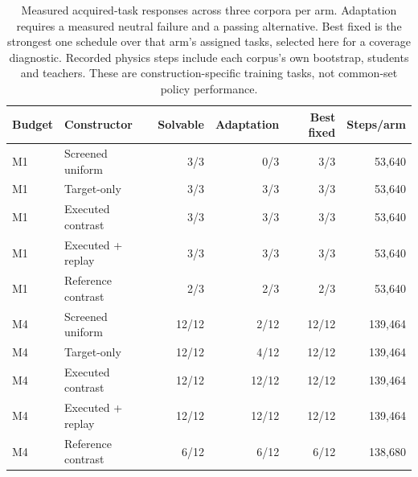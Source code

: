\begin{table}[t]
\centering\small
\begin{tabular}{llrrrr}
\toprule
Budget & Constructor & Solvable & Adaptation & Best fixed & Steps/arm \\
\midrule
M1 & Screened uniform & 3/3 & 0/3 & 3/3 & 53,640 \\
M1 & Target-only & 3/3 & 3/3 & 3/3 & 53,640 \\
M1 & Executed contrast & 3/3 & 3/3 & 3/3 & 53,640 \\
M1 & Executed + replay & 3/3 & 3/3 & 3/3 & 53,640 \\
M1 & Reference contrast & 2/3 & 2/3 & 2/3 & 53,640 \\
M4 & Screened uniform & 12/12 & 2/12 & 12/12 & 139,464 \\
M4 & Target-only & 12/12 & 4/12 & 12/12 & 139,464 \\
M4 & Executed contrast & 12/12 & 12/12 & 12/12 & 139,464 \\
M4 & Executed + replay & 12/12 & 12/12 & 12/12 & 139,464 \\
M4 & Reference contrast & 6/12 & 6/12 & 6/12 & 138,680 \\
\bottomrule
\end{tabular}
\caption{Measured acquired-task responses across three corpora per arm. Adaptation requires a measured neutral failure and a passing alternative. Best fixed is the strongest one schedule over that arm's assigned tasks, selected here for a coverage diagnostic. Recorded physics steps include each corpus's own bootstrap, students and teachers. These are construction-specific training tasks, not common-set policy performance.}
\label{tab:acquisitionyield}
\end{table}

